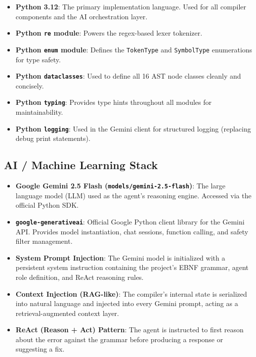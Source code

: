 \documentclass[a4paper,11pt]{article}
\begin{document}
\begin{itemize}
    \item \textbf{Python 3.12}: The primary implementation language. Used for all compiler components and the AI orchestration layer.
    \item \textbf{Python \texttt{re} module}: Powers the regex-based lexer tokenizer.
    \item \textbf{Python \texttt{enum} module}: Defines the \texttt{TokenType} and \texttt{SymbolType} enumerations for type safety.
    \item \textbf{Python \texttt{dataclasses}}: Used to define all 16 AST node classes cleanly and concisely.
    \item \textbf{Python \texttt{typing}}: Provides type hints throughout all modules for maintainability.
    \item \textbf{Python \texttt{logging}}: Used in the Gemini client for structured logging (replacing debug print statements).
\end{itemize}

\subsection{AI / Machine Learning Stack}

\begin{itemize}
    \item \textbf{Google Gemini 2.5 Flash (\texttt{models/gemini-2.5-flash})}: The large language model (LLM) used as the agent's reasoning engine. Accessed via the official Python SDK.
    \item \textbf{\texttt{google-generativeai}}: Official Google Python client library for the Gemini API. Provides model instantiation, chat sessions, function calling, and safety filter management.
    \item \textbf{System Prompt Injection}: The Gemini model is initialized with a persistent system instruction containing the project's EBNF grammar, agent role definition, and ReAct reasoning rules.
    \item \textbf{Context Injection (RAG-like)}: The compiler's internal state is serialized into natural language and injected into every Gemini prompt, acting as a retrieval-augmented context layer.
    \item \textbf{ReAct (Reason + Act) Pattern}: The agent is instructed to first reason about the error against the grammar before producing a response or suggesting a fix.
\end{itemize}
\end{document}
